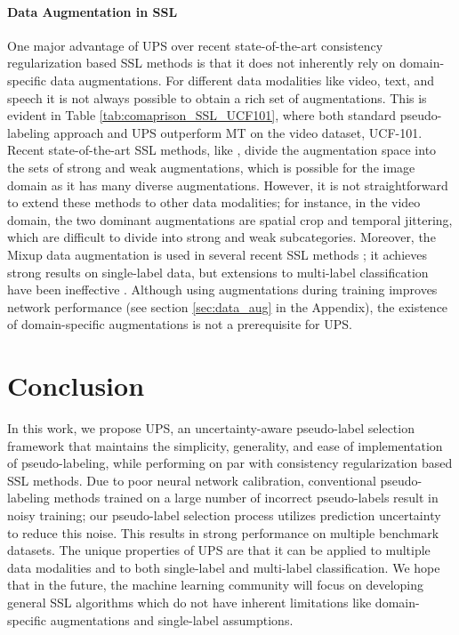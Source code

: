 \documentclass{article} \usepackage{iclr2021_conference,times}
\begin{document}
\paragraph{Data Augmentation in SSL}
One major advantage of UPS over recent state-of-the-art consistency regularization based SSL methods is that it does not inherently rely on domain-specific data augmentations. For different data modalities like video, text, and speech it is not always possible to obtain a rich set of augmentations. This is evident in Table \ref{tab:comaprison_SSL_UCF101}, where both standard pseudo-labeling approach \citep{Lee2013PseudoLabelT} and UPS outperform MT \citep{NIPS2017_6719_meanT} on the video dataset, UCF-101. Recent state-of-the-art SSL methods, like \citep{Berthelot2020ReMixMatch:, sohn2020fixmatch}, divide the augmentation space into the sets of strong and weak augmentations, which is possible for the image domain as it has many diverse augmentations. However, it is not straightforward to extend these methods to other data modalities; for instance, in the video domain, the two dominant augmentations are spatial crop and temporal jittering, which are difficult to divide into strong and weak subcategories. Moreover, the Mixup \citep{zhang2018mixup} data augmentation is used in several recent SSL methods \citep{Verma2019InterpolationCT,NIPS2019_8749_MixMatch, Berthelot2020ReMixMatch:}; it achieves strong results on single-label data, but extensions to multi-label classification have been ineffective \citep{wang2019baseline}.
Although using augmentations during training improves network performance (see section \ref{sec:data_aug} in the Appendix), the existence of domain-specific augmentations is not a prerequisite for UPS.


\vspace{-1mm}
\section{Conclusion}
In this work, we propose UPS, an uncertainty-aware pseudo-label selection framework that maintains the simplicity, generality, and ease of implementation of pseudo-labeling, while performing on par with consistency regularization based SSL methods. Due to poor neural network calibration, conventional pseudo-labeling methods trained on a large number of incorrect pseudo-labels result in noisy training; our pseudo-label selection process utilizes prediction uncertainty to reduce this noise. This results in strong performance on multiple benchmark datasets. The unique properties of UPS are that it can be applied to multiple data modalities and to both single-label and multi-label classification. We hope that in the future, the machine learning community will focus on developing general SSL algorithms which do not have inherent limitations like domain-specific augmentations and single-label assumptions.
\end{document}
